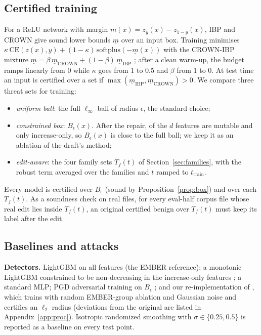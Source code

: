 \documentclass[preprint,12pt,authoryear]{elsarticle}
\begin{document}
\subsection{Certified training}\label{sec:ctmethod}
For a ReLU network with margin $m(x)=z_y(x)-z_{1-y}(x)$, IBP \citep{gowal2018ibp} and CROWN \citep{zhang2018crown} give sound lower bounds $\underline{m}$ over an input box. Training minimises $\kappa\,\mathrm{CE}(z(x),y)+(1-\kappa)\,\mathrm{softplus}(-\underline{m}(x))$ with the CROWN-IBP mixture $\underline{m}=\beta\,\underline{m}_{\text{CROWN}}+(1-\beta)\,\underline{m}_{\text{IBP}}$ \citep{zhang2020crownibp}; after a clean warm-up, the budget ramps linearly from 0 while $\kappa$ goes from 1 to 0.5 and $\beta$ from 1 to 0. At test time an input is certified over a set if $\max(\underline{m}_{\text{IBP}},\underline{m}_{\text{CROWN}})>0$. We compare three threat sets for training:
\begin{itemize}
\item \emph{uniform ball}: the full $\ell_\infty$ ball of radius $\epsilon$, the standard choice;
\item \emph{constrained box}: $B_\epsilon(x)$. After the repair, \PsNMutable{} of the $d$ features are mutable and only \PsNMonotone{} increase-only, so $B_\epsilon(x)$ is close to the full ball; we keep it as an ablation of the draft's method;
\item \emph{edit-aware}: the four family sets $T_f(t)$ of Section~\ref{sec:families}, with the robust term averaged over the families and $t$ ramped to $t_{\text{train}}$.
\end{itemize}
Every model is certified over $B_\epsilon$ (sound by Proposition~\ref{prop:box}) and over each $T_f(t)$. As a soundness check on real files, for every eval-half corpus file whose real edit lies inside $T_f(t)$, an original certified benign over $T_f(t)$ must keep its label after the edit.

\subsection{Baselines and attacks}\label{sec:baselines}
\textbf{Detectors.} LightGBM on all features (the EMBER reference); a monotonic LightGBM constrained to be non-decreasing in the increase-only features \citep{incer2018monotonic}; a standard MLP; PGD adversarial training on $B_\epsilon$ \citep{madry2018towards}; and our re-implementation of \citet{giri2026towards}, which trains with random EMBER-group ablation and Gaussian noise and certifies an $\ell_2$ radius (deviations from the original are listed in Appendix~\ref{app:proc}). Isotropic randomized smoothing \citep{cohen2019certified} with $\sigma\in\{0.25,0.5\}$ is reported as a baseline on every test point.
\end{document}
